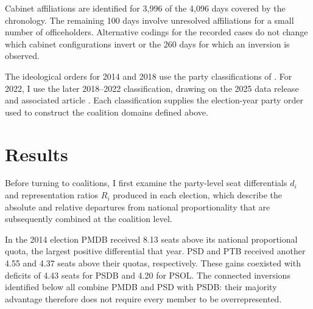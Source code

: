 \documentclass[11pt]{article}
\begin{document}
Cabinet affiliations are identified for 3,996 of the 4,096 days covered by the
chronology. The remaining 100 days involve unresolved affiliations for a small
number of officeholders. Alternative codings for the recorded cases do not
change which cabinet configurations invert or the 260 days for which an
inversion is observed.

The ideological orders for 2014 and 2018 use the party classifications
of \textcite{bolognesi2023nova}. For 2022, I use the later 2018--2022
classification, drawing on the 2025 data release and associated article
\parencite{bolognesi2026desaparecimento}.
Each classification supplies the election-year party order used to construct
the coalition domains defined above.


\section{Results}
\label{sec:party}

Before turning to coalitions, I first examine the party-level seat differentials
\(d_i\) and representation ratios \(R_i\) produced in each election, which
describe the absolute and relative departures from national proportionality
that are subsequently combined at the coalition level.


In the 2014 election PMDB received 8.13 seats above its national proportional
quota, the largest positive differential that year. PSD and PTB received another
4.55 and 4.37 seats above their quotas, respectively. These gains coexisted with
deficits of 4.43 seats for PSDB and 4.20 for PSOL. The connected inversions
identified below all combine PMDB and PSD with PSDB: their majority advantage
therefore does not require every member to be overrepresented.
\end{document}
